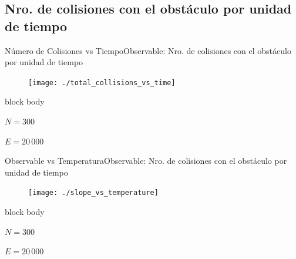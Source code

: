 \documentclass{beamer}
\begin{document}
        \subsection{Nro. de colisiones con el obstáculo por unidad de tiempo}

            \begin{frame}{Número de Colisiones vs Tiempo}{Observable: Nro. de colisiones con el obstáculo por unidad de tiempo}
                \begin{figure}[H!]
                    \texttt{[image: ./total\_collisions\_vs\_time]}
                    \label{fig:slope_1}
                \end{figure}
                \begin{beamercolorbox}[sep=5pt,center]{block body}
                    \begin{minipage}[t]{0.45\textwidth}
                        \centering
                        \small{$N=300$}
                    \end{minipage}
                    \hfill
                    \begin{minipage}[t]{0.45\textwidth}
                        \centering
                        \small{$E=20\,000$}
                    \end{minipage}
                \end{beamercolorbox}
            \end{frame}

            \begin{frame}{Observable vs Temperatura}{Observable: Nro. de colisiones con el obstáculo por unidad de tiempo}
                \begin{figure}[H!]
                    \texttt{[image: ./slope\_vs\_temperature]}
                    \label{fig:slope_2}
                \end{figure}
                \begin{beamercolorbox}[sep=5pt,center]{block body}
                    \begin{minipage}[t]{0.45\textwidth}
                        \centering
                        \small{$N=300$}
                    \end{minipage}
                    \hfill
                    \begin{minipage}[t]{0.45\textwidth}
                        \centering
                        \small{$E=20\,000$}
                    \end{minipage}
                \end{beamercolorbox}
            \end{frame}
\end{document}
